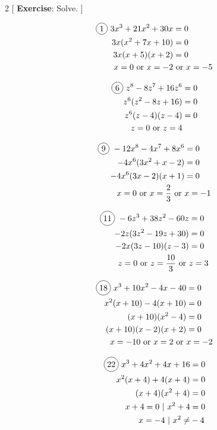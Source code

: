 \begin{multicols}{2}
[
  \textbf{Exercise}: Solve.
]

\begin{align*}
  \circled{1}\ 3x^{3}+21x^{2}+30x&=0\\
  3x(x^{2}+7x+10)&=0\\
  3x(x+5)(x+2)&=0\\
  x=0 \text{ or }x=-2 &\text{ or }x=-5
\end{align*}

\begin{align*}
  \circled{6}\ z^{8}-8z^{7}+16z^{6}&=0\\
  z^{6}(z^{2}-8z+16)&=0\\
  z^{6}(z-4)(z-4)&=0\\
  z=0 \text{ or }z=4
\end{align*}

\begin{align*}
  \circled{9}\ -12x^{8}-4x^{7}+8x^{6}&=0\\
  -4x^{6}(3x^{2}+x-2)&=0\\
  -4x^{6}(3x-2)(x+1)&=0\\
  x=0 \text{ or }x=\frac{2}{3} \text{ or }&x=-1
\end{align*}

\begin{align*}
  \circled{11}\ -6z^{3}+38z^{2}-60z&=0\\
  -2z(3z^{2}-19z+30)&=0\\
  -2x(3z-10)(z-3)&=0\\
  z=0 \text{ or }z=\frac{10}{3} \text{ or }&z=3
\end{align*}

\begin{align*}
  \circled{18}\ x^{3}+10x^{2}-4x-40&=0\\
  x^{2}(x+10)-4(x+10)&=0\\
  (x+10)(x^{2}-4)&=0\\
  (x+10)(x-2)(x+2)&=0\\
  x=-10 \text{ or }x=2 \text{ or }&x=-2
\end{align*}

\begin{align*}
  \circled{22}\ x^{3}+4x^{2}+4x+16&=0\\
  x^{2}(x+4)+4(x+4)&=0\\
  (x+4)(x^{2}+4)&=0\\
  x+4=0 \text{ | } x^{2}+4&=0\\
  x=-4 \text{ | } x^{2}\neq&-4\\
\end{align*}


\end{multicols}
